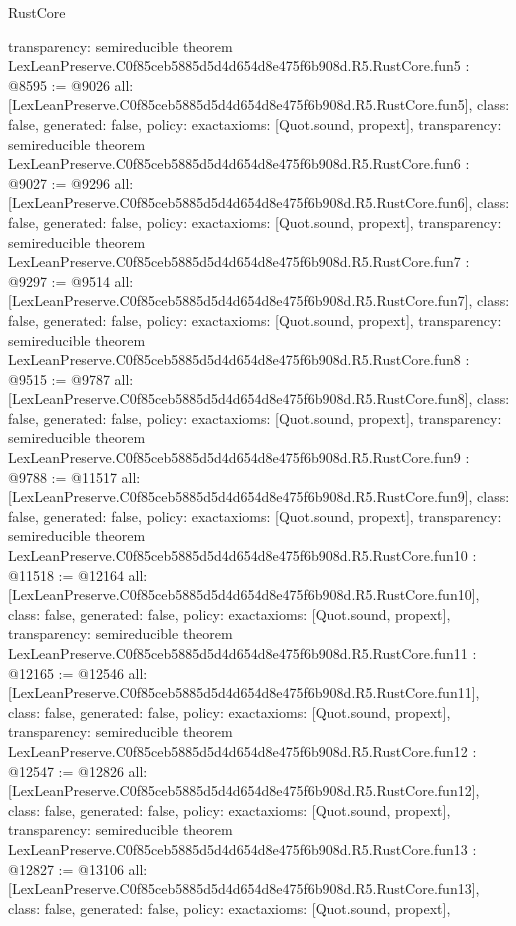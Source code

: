 \begin{lexlean}{RustCore}
\begin{coremodule}
{  transparency: semireducible
}
theorem LexLeanPreserve.C0f85ceb5885d5d4d654d8e475f6b908d.R5.RustCore.fun5 : @8595 := @9026 {
  all: [LexLeanPreserve.C0f85ceb5885d5d4d654d8e475f6b908d.R5.RustCore.fun5],
  class: false,
  generated: false,
  policy: exact{axioms: [Quot.sound, propext]},
  transparency: semireducible
}
theorem LexLeanPreserve.C0f85ceb5885d5d4d654d8e475f6b908d.R5.RustCore.fun6 : @9027 := @9296 {
  all: [LexLeanPreserve.C0f85ceb5885d5d4d654d8e475f6b908d.R5.RustCore.fun6],
  class: false,
  generated: false,
  policy: exact{axioms: [Quot.sound, propext]},
  transparency: semireducible
}
theorem LexLeanPreserve.C0f85ceb5885d5d4d654d8e475f6b908d.R5.RustCore.fun7 : @9297 := @9514 {
  all: [LexLeanPreserve.C0f85ceb5885d5d4d654d8e475f6b908d.R5.RustCore.fun7],
  class: false,
  generated: false,
  policy: exact{axioms: [Quot.sound, propext]},
  transparency: semireducible
}
theorem LexLeanPreserve.C0f85ceb5885d5d4d654d8e475f6b908d.R5.RustCore.fun8 : @9515 := @9787 {
  all: [LexLeanPreserve.C0f85ceb5885d5d4d654d8e475f6b908d.R5.RustCore.fun8],
  class: false,
  generated: false,
  policy: exact{axioms: [Quot.sound, propext]},
  transparency: semireducible
}
theorem LexLeanPreserve.C0f85ceb5885d5d4d654d8e475f6b908d.R5.RustCore.fun9 : @9788 := @11517 {
  all: [LexLeanPreserve.C0f85ceb5885d5d4d654d8e475f6b908d.R5.RustCore.fun9],
  class: false,
  generated: false,
  policy: exact{axioms: [Quot.sound, propext]},
  transparency: semireducible
}
theorem LexLeanPreserve.C0f85ceb5885d5d4d654d8e475f6b908d.R5.RustCore.fun10 : @11518 := @12164 {
  all: [LexLeanPreserve.C0f85ceb5885d5d4d654d8e475f6b908d.R5.RustCore.fun10],
  class: false,
  generated: false,
  policy: exact{axioms: [Quot.sound, propext]},
  transparency: semireducible
}
theorem LexLeanPreserve.C0f85ceb5885d5d4d654d8e475f6b908d.R5.RustCore.fun11 : @12165 := @12546 {
  all: [LexLeanPreserve.C0f85ceb5885d5d4d654d8e475f6b908d.R5.RustCore.fun11],
  class: false,
  generated: false,
  policy: exact{axioms: [Quot.sound, propext]},
  transparency: semireducible
}
theorem LexLeanPreserve.C0f85ceb5885d5d4d654d8e475f6b908d.R5.RustCore.fun12 : @12547 := @12826 {
  all: [LexLeanPreserve.C0f85ceb5885d5d4d654d8e475f6b908d.R5.RustCore.fun12],
  class: false,
  generated: false,
  policy: exact{axioms: [Quot.sound, propext]},
  transparency: semireducible
}
theorem LexLeanPreserve.C0f85ceb5885d5d4d654d8e475f6b908d.R5.RustCore.fun13 : @12827 := @13106 {
  all: [LexLeanPreserve.C0f85ceb5885d5d4d654d8e475f6b908d.R5.RustCore.fun13],
  class: false,
  generated: false,
  policy: exact{axioms: [Quot.sound, propext]},
}
\end{coremodule}
\end{lexlean}

